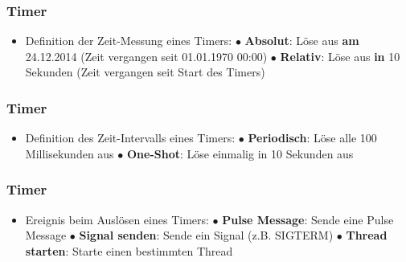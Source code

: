 \documentclass{beamer}
\begin{document}
\begin{frame}[fragile]
 \frametitle{Timer}
 \begin{itemize}
  \item Definition der Zeit-Messung eines Timers:\newline\newline
  $\bullet$ \textbf{Absolut}: L\"ose aus \textbf{am} 24.12.2014\newline
  (Zeit vergangen seit 01.01.1970 00:00)\newline\newline
  $\bullet$ \textbf{Relativ}: L\"ose aus \textbf{in} 10 Sekunden\newline
  (Zeit vergangen seit Start des Timers)
 \end{itemize}
\end{frame}

\begin{frame}[fragile]
 \frametitle{Timer}
 \begin{itemize}
  \item Definition des Zeit-Intervalls eines Timers:\newline\newline
  $\bullet$ \textbf{Periodisch}: L\"ose alle 100 Millisekunden aus\newline\newline
  $\bullet$ \textbf{One-Shot}: L\"ose einmalig in 10 Sekunden aus
 \end{itemize}
\end{frame}

\begin{frame}[fragile]
 \frametitle{Timer}
 \begin{itemize}
  \item Ereignis beim Ausl\"osen eines Timers:\newline\newline
  $\bullet$ \textbf{Pulse Message}: Sende eine Pulse Message\newline\newline
  $\bullet$ \textbf{Signal senden}: Sende ein Signal (z.B. SIGTERM)\newline\newline
  $\bullet$ \textbf{Thread starten}: Starte einen bestimmten Thread
 \end{itemize}
\end{frame}
\end{document}
